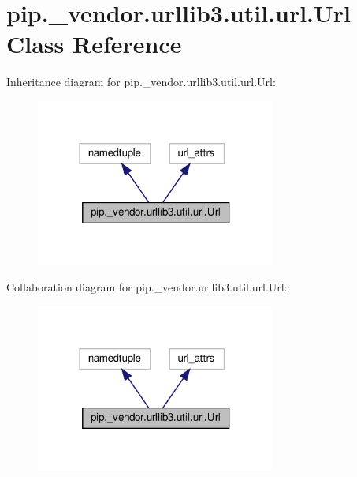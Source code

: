 \hypertarget{classpip_1_1__vendor_1_1urllib3_1_1util_1_1url_1_1Url}{}\section{pip.\+\_\+vendor.\+urllib3.\+util.\+url.\+Url Class Reference}
\label{classpip_1_1__vendor_1_1urllib3_1_1util_1_1url_1_1Url}


Inheritance diagram for pip.\+\_\+vendor.\+urllib3.\+util.\+url.\+Url\+:
\nopagebreak
\begin{figure}[H]
\begin{center}
\leavevmode
\includegraphics[width=223pt]{classpip_1_1__vendor_1_1urllib3_1_1util_1_1url_1_1Url__inherit__graph}
\end{center}
\end{figure}


Collaboration diagram for pip.\+\_\+vendor.\+urllib3.\+util.\+url.\+Url\+:
\nopagebreak
\begin{figure}[H]
\begin{center}
\leavevmode
\includegraphics[width=223pt]{classpip_1_1__vendor_1_1urllib3_1_1util_1_1url_1_1Url__coll__graph}
\end{center}
\end{figure}

